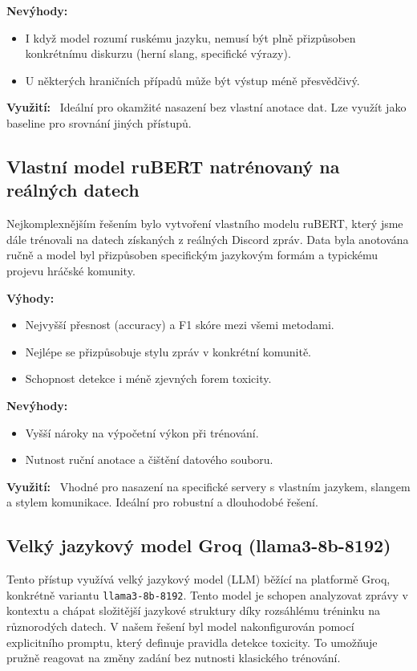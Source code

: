 \documentclass[FM,Proj]{tulthesis}
\begin{document}
\textbf{Nevýhody:}
\begin{itemize}
  \item I když model rozumí ruskému jazyku, nemusí být plně přizpůsoben konkrétnímu diskurzu (herní slang, specifické výrazy).
  \item U některých hraničních případů může být výstup méně přesvědčivý.
\end{itemize}

\textbf{Využití:} \
Ideální pro okamžité nasazení bez vlastní anotace dat. Lze využít jako baseline pro srovnání jiných přístupů.

\subsection{Vlastní model ruBERT natrénovaný na reálných datech}
Nejkomplexnějším řešením bylo vytvoření vlastního modelu ruBERT, který jsme dále trénovali na datech získaných z reálných Discord zpráv. Data byla anotována ručně a model byl přizpůsoben specifickým jazykovým formám a typickému projevu hráčské komunity.

\textbf{Výhody:}
\begin{itemize}
  \item Nejvyšší přesnost (accuracy) a F1 skóre mezi všemi metodami.
  \item Nejlépe se přizpůsobuje stylu zpráv v konkrétní komunitě.
  \item Schopnost detekce i méně zjevných forem toxicity.
\end{itemize}

\textbf{Nevýhody:}
\begin{itemize}
  \item Vyšší nároky na výpočetní výkon při trénování.
  \item Nutnost ruční anotace a čištění datového souboru.
\end{itemize}

\textbf{Využití:} \
Vhodné pro nasazení na specifické servery s vlastním jazykem, slangem a stylem komunikace. Ideální pro robustní a dlouhodobé řešení.
\subsection{Velký jazykový model Groq (llama3-8b-8192)}

Tento přístup využívá velký jazykový model (LLM) běžící na platformě Groq, konkrétně variantu \texttt{llama3-8b-8192}. Tento model je schopen analyzovat zprávy v kontextu a chápat složitější jazykové struktury díky rozsáhlému tréninku na různorodých datech. V našem řešení byl model nakonfigurován pomocí explicitního promptu, který definuje pravidla detekce toxicity. To umožňuje pružně reagovat na změny zadání bez nutnosti klasického trénování.
\end{document}
